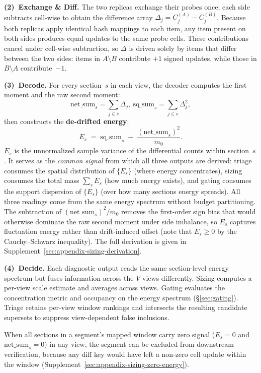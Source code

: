 \textbf{(2)~Exchange \& Diff.}  The two replicas exchange
their probes once; each side subtracts cell-wise to obtain the
difference array
$\Delta_j = C^{(A)}_j - C^{(B)}_j$.
Because both replicas apply identical hash mappings to each
item, any item present on both sides produces equal updates to
the same probe cells.  These contributions cancel under
cell-wise subtraction, so $\Delta$ is driven solely by items
that differ between the two sides: items in $A\setminus B$
contribute $+1$ signed updates, while those in
$B\setminus A$ contribute~$-1$.

\textbf{(3)~Decode.}  For every section~$s$ in each view, the decoder computes the first moment and the raw second moment:
\[
\mathrm{net\_sum}_s = \sum_{j \in s}\Delta_j
,~
\mathrm{sq\_sum}_s = \sum_{j \in s}\Delta_j^2,
\]
then constructs the \textbf{de-drifted energy}:
\begin{equation*}
E_s \;=\; \mathrm{sq\_sum}_s \;-\;
         \frac{(\mathrm{net\_sum}_s)^{2}}{m_0}.
\end{equation*}
$E_s$ is the unnormalized sample variance of the differential
counts within section~$s$.  It serves as the \emph{common signal}
from which all three outputs are derived: triage consumes the
spatial distribution of $\{E_s\}$ (where energy concentrates),
sizing consumes the total mass $\sum_s E_s$ (how much energy
exists), and gating consumes the support dispersion of
$\{E_s\}$ (over how many sections energy spreads).  All three
readings come from the same energy spectrum
without budget
partitioning.  The subtraction of $(\mathrm{net\_sum}_s)^2/m_0$ removes the
first-order sign bias that would otherwise dominate the raw
second moment under side imbalance, so $E_s$ captures
fluctuation energy rather than drift-induced offset (note that
$E_s \ge 0$ by the Cauchy--Schwarz inequality). The full
derivation is given in
Supplement~\ref{sec:appendix-sizing-derivation}.

\textbf{(4)~Decide.} 
Each diagnostic output reads the same section-level energy
spectrum but fuses information across the $V$ views
differently. Sizing computes a per-view scale estimate and averages across views. 
Gating evaluates the concentration metric and occupancy on the energy spectrum (\S\ref{sec:gating}). Triage retains per-view window rankings and intersects the resulting candidate supersets to suppress view-dependent false inclusions.

When all sections in a segment's mapped window carry zero
signal ($E_s{=}0$ and $\mathrm{net\_sum}_s{=}0$) in any view, the segment can be excluded from downstream
verification, because any diff key would have left a
non-zero cell update within the window
(Supplement~\ref{sec:appendix-sizing-zero-energy}).

